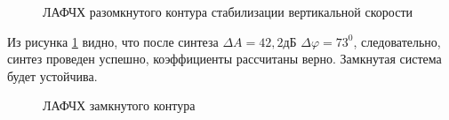 \begin{figure}[H]
    \caption{ЛАФЧХ разомкнутого контура стабилизации вертикальной скорости}
    \label{fig:Вертикальная скорость раз qMIN}
\end{figure}

Из рисунка \ref{fig:Вертикальная скорость раз qMIN} видно, что после синтеза $\Delta A = 42,2 $дБ $\Delta \varphi = 73^0$, следовательно, синтез проведен успешно, коэффициенты рассчитаны верно. Замкнутая система будет устойчива. 

\begin{figure}[H]
    \caption{ЛАФЧХ замкнутого контура }
    \label{fig:Вертикальная скорость зам qMIN}
\end{figure}

